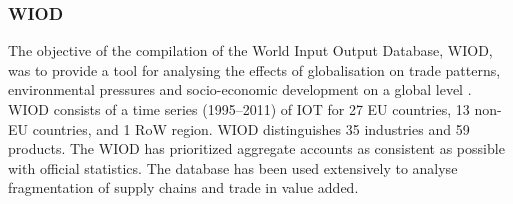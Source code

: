 \subsubsection{WIOD}

The objective of the compilation of the World Input Output Database, WIOD, was
to provide a tool for analysing the effects of globalisation on trade patterns,
environmental pressures and socio-economic development on a global level \cite{timmer_world_2012}. WIOD consists of a time series (1995–2011) of IOT for 27 EU
countries, 13 non-EU countries, and 1 RoW region. WIOD distinguishes 35
industries and 59 products. The WIOD has prioritized aggregate accounts as consistent as possible with official statistics. The database has been used extensively to analyse fragmentation of supply chains and trade in value added.